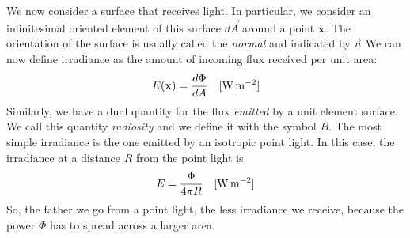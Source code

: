We now consider a surface that receives light. In particular, we consider an infinitesimal oriented element of this surface $d \vec{A}$ around a point $\mathbf{x}$. The orientation of the surface is usually called the \emph{normal} and indicated by $\vec{n}$ We can now define irradiance as the amount of incoming flux received per unit area:
$$
E(\mathbf{x}) = \frac{d \Phi}{d A}  \ \ \ [\SI{}{\watt \per \square \metre}]
$$
Similarly, we have a dual quantity for the flux \emph{emitted} by a unit element surface. We call this quantity \emph{radiosity} and we define it with the symbol $B$.
The most simple irradiance is the one emitted by an isotropic point light. In this case, the irradiance at a distance $R$ from the point light is 
$$
E = \frac{\Phi}{4 \pi R} \ \ \ [\SI{}{\watt \per \square \metre}]
$$
So, the father we go from a point light, the less irradiance we receive, because the power $\Phi$ has to spread across a larger area.

